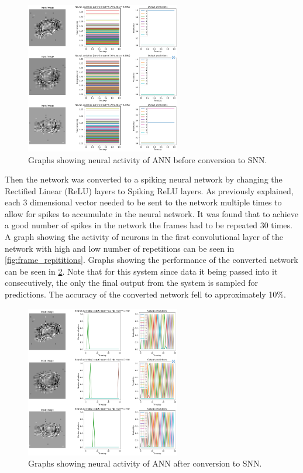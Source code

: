 \begin{figure}[htb]%
    \centering
    \includegraphics[width=0.6\textwidth]{implementation/images/pre_snn_conversion.png}
    \caption{Graphs showing neural activity of ANN before conversion to SNN.}%
    \label{fig:pre_snn_conversion}%
\end{figure}

Then the network was converted to a spiking neural network by changing the Rectified Linear (ReLU) layers to Spiking ReLU layers. As previously explained, each 3 dimensional vector needed to be sent to the network multiple times to allow for spikes to accumulate in the neural network. It was found that to achieve a good number of spikes in the network the frames had to be repeated 30 times. A graph showing the activity of neurons in the first convolutional layer of the network with high and low number of repetitions can be seen in \cref{fig:frame_repititions}. Graphs showing the performance of the converted network can be seen in \cref{fig:post_snn_conversion}. Note that for this system since data it being passed into it consecutively, the only the final output from the system is sampled for predictions. The accuracy of the converted network fell to approximately 10\%.

\begin{figure}[htb]%
    \centering
    \includegraphics[width=0.6\textwidth]{implementation/images/post_snn_conversion.png}
    \caption{Graphs showing neural activity of ANN after conversion to SNN.}%
    \label{fig:post_snn_conversion}%
\end{figure}

